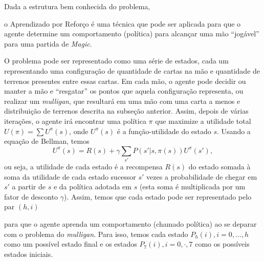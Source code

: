 \documentclass{book}
\begin{document}
Dada a estrutura bem conhecida do problema,

o Aprendizado por Reforço é uma técnica que pode ser aplicada
para que o agente determine um comportamento (política) para alcançar uma mão ``jogável'' para uma partida de \textit{Magic}.

O problema pode ser representado como uma série de estados, cada um representando uma configuração de quantidade de cartas na mão
e quantidade de terrenos presentes entre essas cartas. Em cada mão, o agente pode decidir ou manter a mão e ``resgatar''
os pontos que aquela configuração representa, ou realizar um \textit{mulligan}, que resultará em uma mão com uma carta a menos e
distribuição de terrenos descrita na subseção anterior. Assim, depois de várias iterações, o agente irá encontrar uma política $\pi$
que maximize a utilidade total $U(\pi) = \sum U^\pi(s)$, onde $U^\pi(s)$ é a função-utilidade do estado $s$. Usando a equação de
Bellman, temos \[ U^\pi(s) = R(s) + \gamma\sum\limits_{s'}P(s' | s, \pi(s))U^\pi(s'),\] ou seja, a utilidade de cada estado é a recompensa $R(s)$
do estado somada à soma da utilidade de cada estado sucessor $s'$ vezes a probabilidade de chegar em $s'$ a partir de $s$ e da política adotada
em $s$ (esta soma é multiplicada por um fator de desconto $\gamma$). Assim, temos que cada estado pode ser representado pelo par $(h, i)$

 para que o agente aprenda
um comportamento (chamado política) ao se deparar com o problema do \textit{mulligan}.
Para isso, temos cada estado $P_h(i), i = 0,\ldots, h$ como um possível estado final e
os estados $P_7(i), i = 0,\cdot, 7$ como os possíveis estados iniciais.
\end{document}
